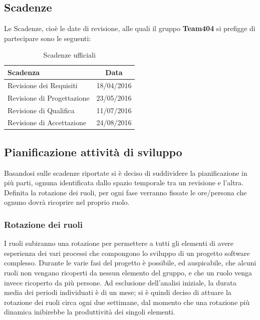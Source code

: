 \documentclass[a4paper,11pt]{article}
\begin{document}
	\subsection{Scadenze}
	Le Scadenze, cioè le date di revisione, alle quali il gruppo \textbf{Team404} si prefigge di partecipare sono le seguenti:
	\begin{table}[h!]
	\begin{center}
		\begin{tabularx}{240pt}{Xc}
			\textbf{Scadenza} & \textbf{Data}\\
			\midrule
			Revisione dei Requisiti & 18/04/2016\\
			Revisione di Progettazione & 23/05/2016\\
			Revisione di Qualifica & 11/07/2016\\
			Revisione di Accettazione & 24/08/2016\\
			\bottomrule
		\end{tabularx}
	\end{center}
	\caption{Scadenze ufficiali	}
	\end{table}
	
	\subsection{Pianificazione attività di sviluppo}
	Basandosi sulle scadenze riportate si è deciso di suddividere la pianificazione in più parti, ognuna identificata dallo spazio temporale tra un revisione e l'altra. Definita la rotazione dei ruoli, per ogni fase verranno fissate le ore/persona che ognuno dovrà ricoprire nel proprio ruolo.
	 \subsubsection{Rotazione dei ruoli}
I ruoli subiranno una rotazione per permettere a tutti gli elementi di avere esperienza dei vari processi che compongono lo sviluppo di un progetto software complesso. Durante le varie fasi del progetto è possibile, ed auspicabile, che alcuni ruoli non vengano ricoperti da nessun elemento del gruppo, e che un ruolo venga invece ricoperto da più persone. Ad esclusione dell'analisi iniziale, la durata media dei periodi individuati è di un mese; si è quindi deciso di attuare la rotazione dei ruoli circa ogni due settimane, dal momento che una rotazione più dinamica inibirebbe la produttività dei singoli elementi.
		\pagebreak
\end{document}
